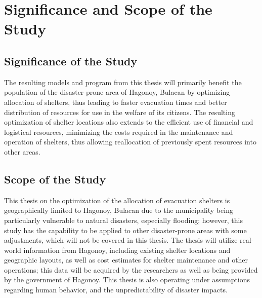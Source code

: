 \documentclass[english,12pt,a4paper]{article}
\begin{document}
	\section*{Significance and Scope of the Study}
		\subsection*{Significance of the Study}
			The resulting models and program from this thesis will primarily benefit the population of the disaster-prone area of Hagonoy, Bulacan by optimizing allocation of shelters, thus leading to faster evacuation times and better distribution of resources for use in the welfare of its citizens. The resulting optimization of shelter locations also extends to the efficient use of financial and logistical resources, minimizing the costs required in the maintenance and operation of shelters, thus allowing reallocation of previously spent resources into other areas.
		\subsection*{Scope of the Study}
			This thesis on the optimization of the allocation of evacuation shelters is geographically limited to Hagonoy, Bulacan due to the municipality being particularly vulnerable to natural disasters, especially flooding; however, this study has the capability to be applied to other disaster-prone areas with some adjustments, which will not be covered in this thesis. The thesis will utilize real-world information from Hagonoy, including existing shelter locations and geographic layouts, as well as cost estimates for shelter maintenance and other operations; this data will be acquired by the researchers as well as being provided by the government of Hagonoy. This thesis is also operating under assumptions regarding human behavior, and the unpredictability of disaster impacts.
	
	
\end{document}
